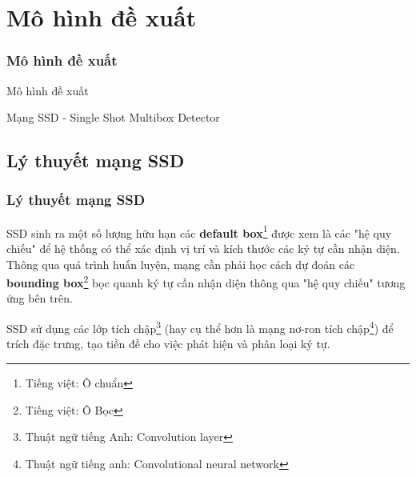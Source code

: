 \documentclass{beamer}
\begin{document}
	
	\section{Mô hình đề xuất}
	\begin{frame}
		\frametitle{Mô hình đề xuất}
		{\Huge Mô hình đề xuất}
		\hspace{10 cm}
		
		
		
		
		Mạng SSD - Single Shot Multibox Detector
	\end{frame}
	
	\subsection{Lý thuyết mạng SSD}
	
	\frame{\tableofcontents[currentsection]}
	
	\begin{frame}
		\frametitle{Lý thuyết mạng SSD}
		
		SSD\cite{liu2016ssd} sinh ra một số lượng hữu hạn các \textbf{default box}\footnote{Tiếng việt: Ô chuẩn} được xem là các "hệ quy chiếu" để hệ thống có thể xác định vị trí và kích thước các ký tự cần nhận diện. Thông qua quá trình huấn luyện, mạng cần phải học cách dự đoán các \textbf{bounding box}\footnote{Tiếng việt: Ô Bọc} bọc quanh ký tự cần nhận diện thông qua "hệ quy chiếu" tương ứng bên trên.
		
		SSD\cite{liu2016ssd} sử dụng các lớp tích chập\footnote{Thuật ngữ tiếng Anh: Convolution layer} (hay cụ thể hơn là mạng nơ-ron tích chập\footnote{Thuật ngữ tiếng anh: Convolutional neural network}) để trích đặc trưng, tạo tiền đề cho việc phát hiện và phân loại ký tự. \\
		
	\end{frame}
	
	
	
\end{document}
